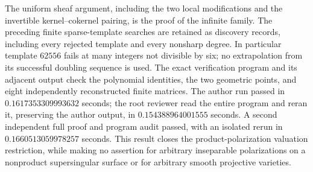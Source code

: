 \begin{remark}
\label{rem:DE-A3-all-ss-rectangles-checks}
The uniform sheaf argument, including the two local modifications and
the invertible kernel--cokernel pairing, is the proof of the infinite
family.  The preceding finite sparse-template searches are retained
as discovery records, including every rejected template and every
nonsharp degree.  In particular template $62556$ fails at many
integers not divisible by six; no extrapolation from its successful
doubling sequence is used.  The exact verification program
and its adjacent output check the polynomial identities, the two
geometric points, and eight independently reconstructed finite matrices.
The author run passed in $0.1617353309993632$ seconds; the root reviewer
read the entire program and reran it, preserving the author output,
in $0.154388964001555$ seconds.  A second independent full proof and
program audit passed, with an isolated rerun in
$0.1660513059978257$ seconds.  This result closes the product-polarization valuation
restriction, while making no assertion for arbitrary inseparable
polarizations on a nonproduct supersingular surface or for arbitrary
smooth projective varieties.
\end{remark}

